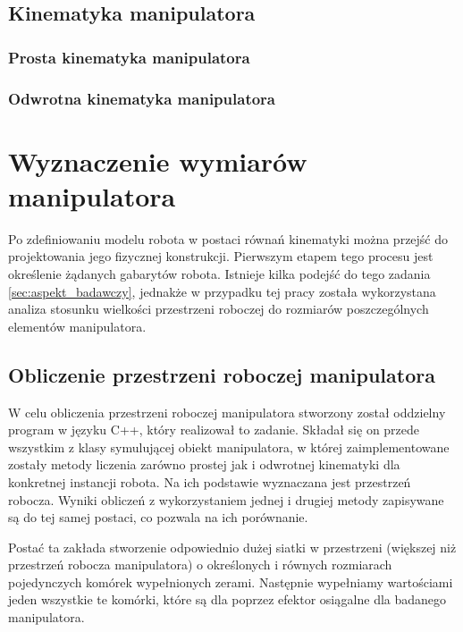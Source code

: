 \documentclass[printmode]{mgr}
\begin{document}
\section{Kinematyka manipulatora}

\subsection{Prosta kinematyka manipulatora}\label{sec:prosta_kinematyka}

\subsection{Odwrotna kinematyka manipulatora}



\chapter{Wyznaczenie wymiarów manipulatora}\label{sec:wyznaczenie_wymiarow_manipulatora}
Po zdefiniowaniu modelu robota w postaci równań kinematyki można przejść do projektowania
jego fizycznej konstrukcji. Pierwszym etapem tego procesu jest określenie żądanych gabarytów
robota. Istnieje kilka podejść do tego zadania \ref{sec:aspekt_badawczy}, jednakże w przypadku tej pracy została
wykorzystana analiza stosunku wielkości przestrzeni roboczej do rozmiarów poszczególnych
elementów manipulatora.

\section{Obliczenie przestrzeni roboczej manipulatora}
W celu obliczenia przestrzeni roboczej manipulatora stworzony został oddzielny program w języku C++, 
który realizował to zadanie. Składał się on przede wszystkim z klasy symulującej obiekt manipulatora, 
w której zaimplementowane zostały metody liczenia zarówno prostej jak i odwrotnej kinematyki dla
konkretnej instancji robota. Na ich podstawie wyznaczana jest przestrzeń robocza. Wyniki obliczeń
z wykorzystaniem jednej i drugiej metody zapisywane są do tej samej postaci, co pozwala na ich porównanie.

Postać ta zakłada stworzenie odpowiednio dużej siatki w przestrzeni (większej niż
przestrzeń robocza manipulatora) o określonych i równych rozmiarach pojedynczych komórek
wypełnionych zerami. Następnie wypełniamy wartościami jeden wszystkie te komórki, które są dla
poprzez efektor osiągalne dla badanego manipulatora. 
\end{document}
